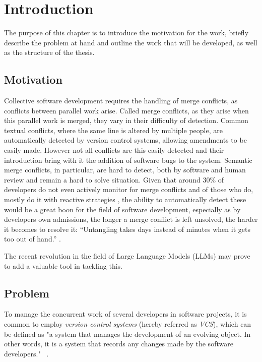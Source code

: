 \chapter{Introduction} \label{chap:intro}

The purpose of this chapter is to introduce the motivation for the work, briefly describe the problem at hand and outline the work that will be developed, as well as the structure of the thesis.

\section{Motivation} \label{sec:motivation}

Collective software development requires the handling of merge conflicts, as conflicts between parallel work arise. Called merge conflicts, as they arise when this parallel work is merged, they vary in their difficulty of detection.
Common textual conflicts, where the same line is altered by multiple people, are automatically detected by version control systems, allowing amendments to be easily made. However not all conflicts are this easily detected and their introduction bring with it the addition of software bugs to the system. Semantic merge conflicts, in particular, are hard to detect, both by software and human review and remain a hard to solve situation. Given that around 30\% of developers do not even actively monitor for merge conflicts and of those who do, mostly do it with reactive strategies \citep{kn:lifecycle}, the ability to automatically detect these would be a great boon for the field of software development, especially as by developers own admissions, the longer a merge conflict is left unsolved, the harder it becomes to resolve it: “Untangling takes days instead of minutes when it gets too out of hand.” \citep{kn:lifecycle}.

The recent revolution in the field of Large Language Models (LLMs) may prove to add a valuable tool in tackling this.


\section{Problem} \label{sec:problem}

To manage the concurrent work of several developers in software projects, it is common to employ \emph{version control systems} (hereby referred as \emph{VCS}), which can be defined as "a system that manages the development of an evolving object. In other words, it is a system that records any changes made by the software developers." ~\citep{kn:vers_review}.


